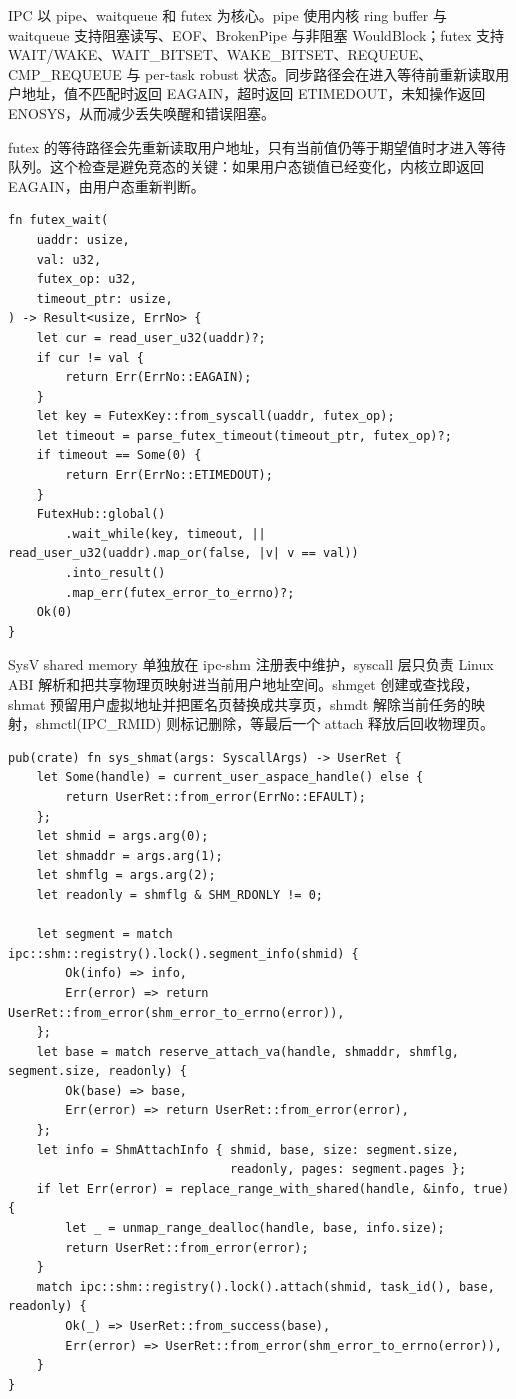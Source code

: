 \documentclass[12pt,openany,oneside,AutoFakeBold=true]{ctexbook}
\newcommand{\code}[1]{\textnormal{\rmfamily #1}}
\newcommand{\syscall}[1]{\textnormal{\rmfamily #1}}
\begin{document}
IPC 以 pipe、waitqueue 和 futex 为核心。pipe 使用内核 ring buffer 与 waitqueue 支持阻塞读写、EOF、BrokenPipe 与非阻塞 WouldBlock；futex 支持 WAIT/WAKE、WAIT\_BITSET、WAKE\_BITSET、REQUEUE、CMP\_REQUEUE 与 per-task robust 状态。同步路径会在进入等待前重新读取用户地址，值不匹配时返回 \code{EAGAIN}，超时返回 \code{ETIMEDOUT}，未知操作返回 \code{ENOSYS}，从而减少丢失唤醒和错误阻塞。


futex 的等待路径会先重新读取用户地址，只有当前值仍等于期望值时才进入等待队列。这个检查是避免竞态的关键：如果用户态锁值已经变化，内核立即返回 \code{EAGAIN}，由用户态重新判断。

\begin{lstlisting}
fn futex_wait(
    uaddr: usize,
    val: u32,
    futex_op: u32,
    timeout_ptr: usize,
) -> Result<usize, ErrNo> {
    let cur = read_user_u32(uaddr)?;
    if cur != val {
        return Err(ErrNo::EAGAIN);
    }
    let key = FutexKey::from_syscall(uaddr, futex_op);
    let timeout = parse_futex_timeout(timeout_ptr, futex_op)?;
    if timeout == Some(0) {
        return Err(ErrNo::ETIMEDOUT);
    }
    FutexHub::global()
        .wait_while(key, timeout, || read_user_u32(uaddr).map_or(false, |v| v == val))
        .into_result()
        .map_err(futex_error_to_errno)?;
    Ok(0)
}
\end{lstlisting}

SysV shared memory 单独放在 \code{ipc-shm} 注册表中维护，syscall 层只负责 Linux ABI 解析和把共享物理页映射进当前用户地址空间。\syscall{shmget} 创建或查找段，\syscall{shmat} 预留用户虚拟地址并把匿名页替换成共享页，\syscall{shmdt} 解除当前任务的映射，\syscall{shmctl(IPC\_RMID)} 则标记删除，等最后一个 attach 释放后回收物理页。

\begin{lstlisting}
pub(crate) fn sys_shmat(args: SyscallArgs) -> UserRet {
    let Some(handle) = current_user_aspace_handle() else {
        return UserRet::from_error(ErrNo::EFAULT);
    };
    let shmid = args.arg(0);
    let shmaddr = args.arg(1);
    let shmflg = args.arg(2);
    let readonly = shmflg & SHM_RDONLY != 0;

    let segment = match ipc::shm::registry().lock().segment_info(shmid) {
        Ok(info) => info,
        Err(error) => return UserRet::from_error(shm_error_to_errno(error)),
    };
    let base = match reserve_attach_va(handle, shmaddr, shmflg, segment.size, readonly) {
        Ok(base) => base,
        Err(error) => return UserRet::from_error(error),
    };
    let info = ShmAttachInfo { shmid, base, size: segment.size,
                               readonly, pages: segment.pages };
    if let Err(error) = replace_range_with_shared(handle, &info, true) {
        let _ = unmap_range_dealloc(handle, base, info.size);
        return UserRet::from_error(error);
    }
    match ipc::shm::registry().lock().attach(shmid, task_id(), base, readonly) {
        Ok(_) => UserRet::from_success(base),
        Err(error) => UserRet::from_error(shm_error_to_errno(error)),
    }
}
\end{lstlisting}
\end{document}
